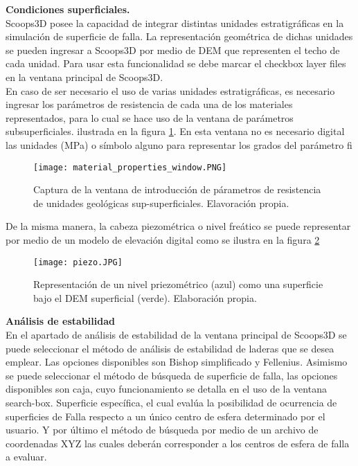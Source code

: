 \textbf{Condiciones superficiales.}\\
Scoops3D posee la capacidad de integrar distintas unidades estratigr\'{a}ficas en la simulaci\'{o}n
de superficie de falla. La representaci\'{o}n geom\'{e}trica de dichas unidades se pueden ingresar
a Scoops3D por medio de DEM que representen el techo de cada unidad.
Para usar esta funcionalidad se debe marcar el checkbox layer files en la ventana principal
de Scoops3D.
\\

En caso de ser necesario el uso de varias unidades estratigr\'{a}ficas, es necesario ingresar
los par\'{a}metros de resistencia de cada una de los materiales representados, para lo cual se
hace uso de la ventana de par\'{a}metros subsuperficiales. ilustrada en la figura \ref{fig:parameters}. En esta ventana no es necesario  digital las unidades (MPa) o s\'imbolo alguno para representar los grados del par\'ametro  fi \\

\begin{figure}[H]
\centering
\texttt{[image: material\_properties\_window.PNG]}
\caption{Captura de la ventana de introducci\'on de p\'arametros de resistencia de unidades geol\'ogicas sup-superficiales. Elavoraci\'on propia.}
\label{fig:parameters}
\end{figure}


De la misma manera, la cabeza piezom\'{e}trica o nivel fre\'{a}tico se puede representar por
medio de un modelo de elevaci\'{o}n digital como se ilustra en la figura \ref{modelo piezometrico}
\\


\begin{figure}[H]
\centering
\texttt{[image: piezo.JPG]}
\caption{Representaci\'on de un nivel priezom\'etrico (azul) como una superficie bajo el DEM superficial (verde). Elaboraci\'on propia.}
\label{modelo piezometrico}
\end{figure}

\textbf{An\'{a}lisis de estabilidad}\\
En el apartado de an\'{a}lisis de estabilidad de la ventana principal de Scoops3D se puede
seleccionar el m\'{e}todo de an\'{a}lisis de estabilidad de laderas que se desea emplear. Las
opciones disponibles son Bishop simplificado y Fellenius.
Asimismo se puede seleccionar el m\'{e}todo de b\'{u}squeda de superficie de falla, las opciones
disponibles son caja, cuyo funcionamiento se detalla en el uso de la ventana search-box.
Superficie espec\'{i}fica, el cual eval\'{u}a la posibilidad de ocurrencia de superficies de Falla
respecto a un \'{u}nico centro de esfera determinado por el usuario. Y por \'{u}ltimo el m\'{e}todo de
b\'usqueda por medio de un archivo de coordenadas XYZ las cuales deber\'an corresponder a
los centros de esfera de falla a evaluar.\par

